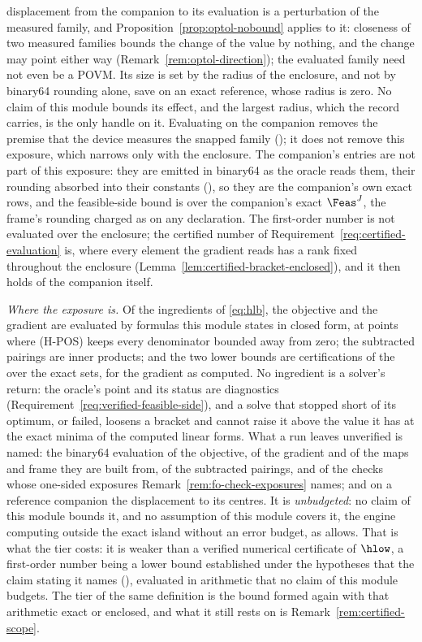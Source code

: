 \begin{remark}
displacement from the companion to its evaluation is a perturbation of the
measured family, and Proposition~\ref{prop:optol-nobound} applies to it:
closeness of two measured families bounds the change of the value by
nothing, and the change may point either way
(Remark~\ref{rem:optol-direction}); the evaluated family need not even be a
POVM. Its size is set by the radius of the enclosure, and not by binary64
rounding alone, save on an exact reference, whose radius is zero. No claim
of this module bounds its effect, and the largest radius, which the record
carries, is the only handle on it. Evaluating on the companion removes the
premise that the device measures the snapped family
(); it does not remove this
exposure, which narrows only with the enclosure. The companion's entries are
not part of this exposure: they are emitted in binary64 as the oracle reads
them, their rounding absorbed into their constants
(), so they are the companion's own
exact rows, and the feasible-side bound is over the companion's exact
$\Feas^{J}$, the frame's rounding charged as on any declaration. The
first-order number is not evaluated over the enclosure; the certified number
of Requirement~\ref{req:certified-evaluation} is, where every element the
gradient reads has a rank fixed throughout the enclosure
(Lemma~\ref{lem:certified-bracket-enclosed}), and it then holds of the
companion itself.

\emph{Where the exposure is.} Of the ingredients of \eqref{eq:hlb}, the
objective and the gradient are evaluated by formulas this module states
in closed form, at points where (H-POS) keeps every denominator bounded
away from zero; the subtracted pairings are inner products; and the two
lower bounds are certifications of the  over the exact
sets, for the gradient as computed. No ingredient is a solver's return: the
oracle's point and its status are diagnostics
(Requirement~\ref{req:verified-feasible-side}), and a solve that stopped
short of its optimum, or failed, loosens a bracket and cannot raise it
above the value it has at the exact minima of the computed linear forms.
What a run leaves unverified is named: the binary64 evaluation of the
objective, of the gradient and of the maps and frame they are built from,
of the subtracted pairings, and of the checks whose one-sided exposures
Remark~\ref{rem:fo-check-exposures} names; and on a reference companion
the displacement to its centres. It is \emph{unbudgeted}: no claim of this
module bounds it, and no assumption of this module covers it, the engine
computing outside the exact island without an error budget, as
 allows. That is what the
 tier costs: it is weaker than a verified numerical
certificate of $\hlow$, a first-order number being a lower bound
established under the hypotheses that the claim stating it names
(), evaluated in arithmetic that no claim of this
module budgets. The  tier of the same definition is the bound
formed again with that arithmetic exact or enclosed, and what it still rests
on is Remark~\ref{rem:certified-scope}.
\end{remark}
